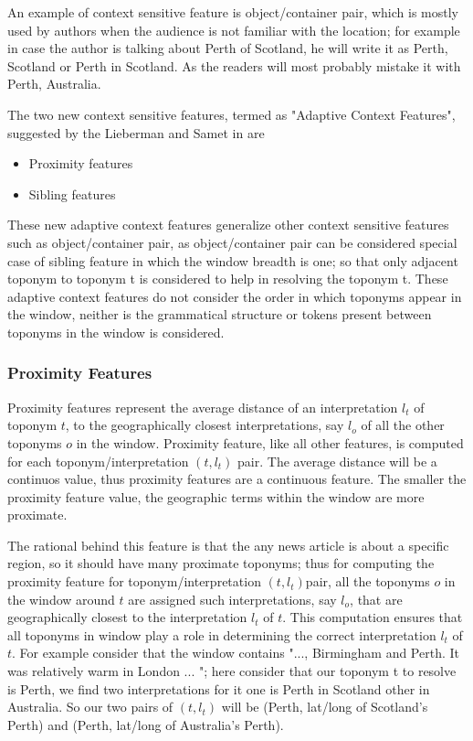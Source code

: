 \documentclass[
     11pt,         %
     a4paper,      %
     oneside,
     ]{article}
\begin{document}
An example of context sensitive feature is object/container pair, which is mostly used by authors when the audience is not familiar with the location; for example in case the author is talking about Perth of Scotland, he will write it as Perth, Scotland or Perth in Scotland. As the readers will most probably mistake it with Perth, Australia. 

The two new context sensitive features, termed as "Adaptive Context Features", suggested by the Lieberman and Samet in \cite{Lieberman12adaptivecontext} are 
\begin{itemize}
	\item Proximity features
	\item Sibling features
\end{itemize} 
These new adaptive context features generalize other context sensitive features such as object/container pair, as object/container pair can be considered special case of sibling feature in which the window breadth is one; so that only adjacent toponym to toponym t is considered to help in resolving the toponym t. These adaptive context features do not consider the order in which toponyms appear in the window, neither is the grammatical structure or tokens present between toponyms in the window is considered.   
\subsubsection{Proximity Features}
Proximity features represent the average distance of an interpretation $l_t$ of toponym $t$, to the geographically closest interpretations, say $l_o$ of all the other toponyms $o$ in the window. Proximity feature, like all other features, is computed for each toponym/interpretation $(t, l_t)$ pair. The average distance will be a continuos value, thus proximity features are a continuous feature. The smaller the proximity feature value, the geographic terms within the window are more proximate.

The rational behind this feature is that the any news article is about a specific region, so it should have many proximate toponyms; thus for computing the proximity feature for toponym/interpretation $(t, l_t)$pair, all the toponyms $o$ in the window around $t$ are assigned such interpretations, say $l_o$, that are geographically closest to the interpretation $l_t$ of $t$. This computation ensures that all toponyms in window play a role in determining the correct interpretation $l_t$ of $t$. For example consider that the window contains "..., Birmingham and Perth. It was relatively warm in London ... "; here consider that our toponym t to resolve is Perth, we find two interpretations for it one is Perth in Scotland other in Australia. So our two pairs of $(t, l_t)$ will be (Perth, lat/long of Scotland's Perth) and (Perth, lat/long of Australia's Perth).
\end{document}
